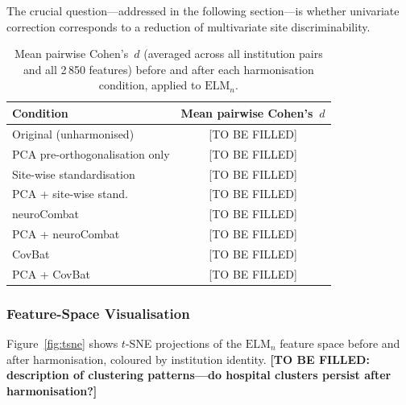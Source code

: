 \documentclass[preprint,12pt]{elsarticle}
\begin{document}
The crucial question---addressed in the following section---is whether
univariate correction corresponds to a reduction of multivariate site
discriminability.

\begin{table}[htbp]
  \centering
  \caption{Mean pairwise Cohen's~$d$ (averaged across all institution
    pairs and all 2\,850 features) before and after each harmonisation
    condition, applied to $\mathrm{ELM}_n$.}
  \label{tab:cohend_summary}
  \begin{tabular}{lc}
    \toprule
    \textbf{Condition} & \textbf{Mean pairwise Cohen's~$d$} \\
    \midrule
    Original (unharmonised)         & [TO BE FILLED] \\
    PCA pre-orthogonalisation only  & [TO BE FILLED] \\
    Site-wise standardisation       & [TO BE FILLED] \\
    PCA + site-wise stand.          & [TO BE FILLED] \\
    neuroCombat                     & [TO BE FILLED] \\
    PCA + neuroCombat               & [TO BE FILLED] \\
    CovBat                          & [TO BE FILLED] \\
    PCA + CovBat                    & [TO BE FILLED] \\
    \bottomrule
  \end{tabular}
\end{table}

\subsubsection{Feature-Space Visualisation}
\label{subsubsec:tsne}

Figure~\ref{fig:tsne} shows $t$-SNE projections of the
$\mathrm{ELM}_n$ feature space before and after harmonisation,
coloured by institution identity.
\textbf{[TO BE FILLED: description of clustering patterns---do
hospital clusters persist after harmonisation?]}
\end{document}
